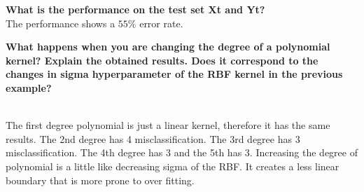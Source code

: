 \documentclass[11pt,oneside,a4paper]{article}
\begin{document}
\textbf{What is the performance on the test set Xt and Yt?}\\
The performance shows a $55\%$ error rate.

\textbf{What happens when you are changing the degree of a polynomial kernel? Explain the obtained results.
Does it correspond to the changes in sigma hyperparameter of the RBF kernel in the previous example?}\\\

The first degree polynomial is just a linear kernel, therefore it has the same results. The 2nd degree has 4 misclassification. The 3rd degree has 3 misclassification. The 4th degree has 3 and the 5th has 3. Increasing the degree of polynomial is a little like decreasing sigma of the RBF. It creates a less linear boundary that is more prone to over fitting. 
\end{document}
